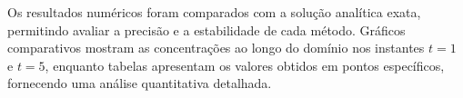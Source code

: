 \documentclass{article}
\begin{document}
Os resultados numéricos foram comparados com a solução analítica exata, permitindo avaliar a precisão e a estabilidade de cada método. Gráficos comparativos mostram as concentrações ao longo do domínio nos instantes \(t=1\) e \(t=5\), enquanto tabelas apresentam os valores obtidos em pontos específicos, fornecendo uma análise quantitativa detalhada.







\end{document}

